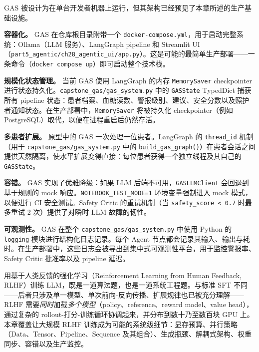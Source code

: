\begin{keybox}
GAS 被设计为在单台开发者机器上运行，但其架构已经预见了本章所述的生产基础设施。

\textbf{容器化。}
GAS 在仓库根目录附带一个 \texttt{docker-compose.yml}，用于启动完整系统：Ollama（LLM 服务）、LangGraph pipeline 和 Streamlit UI（\texttt{part5\_agentic/ch28\_agentic\_ui/app.py}）。这是可能的最简单生产部署——一条命令（\texttt{docker compose up}）即可启动整个技术栈。

\textbf{规模化状态管理。}
当前 GAS 使用 LangGraph 的内存 \texttt{MemorySaver} checkpointer 进行状态持久化。\texttt{capstone\_gas/gas\_system.py} 中的 \texttt{GASState} TypedDict 捕获所有 pipeline 状态：患者档案、血糖读数、警报级别、建议、安全分数以及照护者通知状态。在生产部署中，\texttt{MemorySaver} 将被持久化 checkpointer（例如 PostgreSQL）取代，以便在进程重启后仍然存活。

\textbf{多患者扩展。}
原型中的 GAS 一次处理一位患者。LangGraph 的 \texttt{thread\_id} 机制（用于 \texttt{capstone\_gas/gas\_system.py} 中的 \texttt{build\_gas\_graph()}）在患者会话之间提供天然隔离，使水平扩展变得直接：每位患者获得一个独立线程及其自己的 \texttt{GASState}。

\textbf{容错。}
GAS 实现了优雅降级：如果 LLM 后端不可用，\texttt{GASLLMClient} 会回退到基于规则的 mock 响应。\texttt{NOTEBOOK\_TEST\_MODE=1} 环境变量强制进入 mock 模式，以便进行 CI 安全测试。Safety Critic 的重试机制（当 \texttt{safety\_score < 0.7} 时最多重试 2 次）提供了对瞬时 LLM 故障的韧性。

\textbf{可观测性。}
GAS 在整个 \texttt{capstone\_gas/gas\_system.py} 中使用 Python 的 \texttt{logging} 模块进行结构化日志记录。每个 Agent 节点都会记录其输入、输出与耗时。在生产部署中，这些日志会被导出到集中式可观测性平台，用于监控警报率、Safety Critic 批准率以及 pipeline 延迟。
\end{keybox}

用基于人类反馈的强化学习（Reinforcement Learning from Human Feedback, RLHF）训练 LLM，既是一道算法题，也是一道系统工程题。与标准 SFT 不同——后者只涉及单一模型、单次前向-反向传播、扩展规律也已被充分理解——RLHF 需要\emph{同时}加载\emph{多个模型}（policy、reference、reward model、value head），通过复杂的 rollout-打分-训练循环协调起来，并分布到数十乃至数百块 GPU 上。本章覆盖让大规模 RLHF 训练成为可能的系统级细节：显存预算、并行策略（Data、Tensor、Pipeline、Sequence 及其组合）、生成瓶颈、解耦式架构、权重同步、容错以及生产监控。

